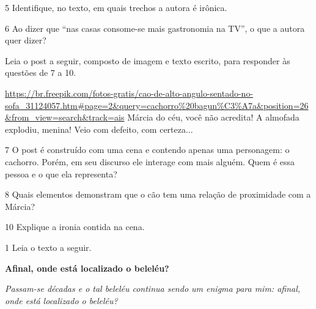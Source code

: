 {\num{5} Identifique, no texto, em quais trechos a autora é irônica.



\num{6} Ao dizer que ``nas casas consome-se mais gastronomia na TV'', o
que a autora quer dizer?



Leia o post a seguir, composto de imagem e texto escrito, para responder
às questões de 7 a 10.

\url{https://br.freepik.com/fotos-gratis/cao-de-alto-angulo-sentado-no-sofa_31124057.htm\#page=2\&query=cachorro\%20bagun\%C3\%A7a\&position=26\&from_view=search\&track=ais}
Márcia do céu, você não acredita! A almofada explodiu, menina! Veio com
defeito, com certeza...

\num{7} O post é construído com uma cena e contendo apenas uma
personagem: o cachorro. Porém, em seu discurso ele interage com mais
alguém. Quem é essa pessoa e o que ela representa?



\num{8} Quais elementos demonstram que o cão tem uma relação de
proximidade com a Márcia?



\num{10} Explique a ironia contida na cena.




\num{1} Leia o texto a seguir.

\textbf{Afinal, onde está localizado o beleléu?}

\emph{Passam-se décadas e o tal beleléu continua sendo um enigma para
mim: afinal, onde está localizado o beleléu?}

}

